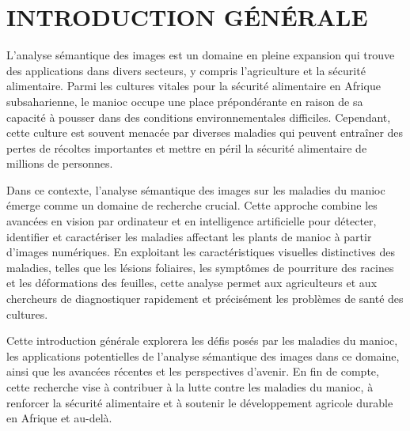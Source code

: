\chapter*{INTRODUCTION GÉNÉRALE}
\adjustmtc
\thispagestyle{MyStyle}


L'analyse sémantique des images est un domaine en pleine expansion qui trouve des applications dans divers secteurs, y compris l'agriculture et la sécurité alimentaire. Parmi les cultures vitales pour la sécurité alimentaire en Afrique subsaharienne, le manioc occupe une place prépondérante en raison de sa capacité à pousser dans des conditions environnementales difficiles. Cependant, cette culture est souvent menacée par diverses maladies qui peuvent entraîner des pertes de récoltes importantes et mettre en péril la sécurité alimentaire de millions de personnes.\par

Dans ce contexte, l'analyse sémantique des images sur les maladies du manioc émerge comme un domaine de recherche crucial. Cette approche combine les avancées en vision par ordinateur et en intelligence artificielle pour détecter, identifier et caractériser les maladies affectant les plants de manioc à partir d'images numériques. En exploitant les caractéristiques visuelles distinctives des maladies, telles que les lésions foliaires, les symptômes de pourriture des racines et les déformations des feuilles, cette analyse permet aux agriculteurs et aux chercheurs de diagnostiquer rapidement et précisément les problèmes de santé des cultures.\par

Cette introduction générale explorera les défis posés par les maladies du manioc, les applications potentielles de l'analyse sémantique des images dans ce domaine, ainsi que les avancées récentes et les perspectives d'avenir. En fin de compte, cette recherche vise à contribuer à la lutte contre les maladies du manioc, à renforcer la sécurité alimentaire et à soutenir le développement agricole durable en Afrique et au-delà.\par